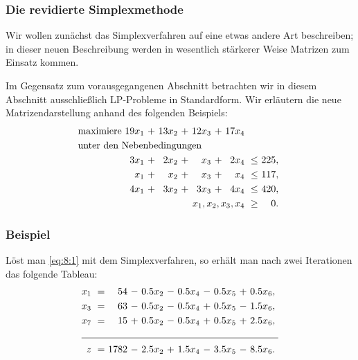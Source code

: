 \documentclass[smaller]{beamer}
\begin{document}
\begin{frame}
 \frametitle{Die revidierte Simplexmethode}
 Wir wollen zunächst das Simplexverfahren auf eine etwas andere Art beschreiben; in dieser neuen Beschreibung werden in wesentlich stärkerer Weise \alert{Matrizen} zum Einsatz kommen. \\ \vspace*{0.2cm}

Im Gegensatz zum vorausgegangenen Abschnitt betrachten wir in diesem Abschnitt ausschließlich LP-Probleme in Standardform. Wir erläutern die neue Matrizendarstellung anhand des folgenden Beispiels:
\begin{align}
\begin{alignedat}{6}
\label{eq:8:1}
& \text{maximiere } & 19x_1 &\ + &\ 13x_2 &\ + &\ 12x_3 &\ + &\ 17x_4 & & \\
& \rlap{unter den Nebenbedingungen} & & & & & & & & & \\
&& 3x_1 &\ + &\ 2x_2 &\ + &\  x_3 &\ + &\ 2x_4 &\ \leq &\ 225,\ \\
&&  x_1 &\ + &\  x_2 &\ + &\  x_3 &\ + &\  x_4 &\ \leq &\ 117,\ \\
&& 4x_1 &\ + &\ 3x_2 &\ + &\ 3x_3 &\ + &\ 4x_4 &\ \leq &\ 420,\ \\
&& & & & & & & \llap{$x_1,x_2,x_3,x_4$} &\ \geq &\ 0.\
\end{alignedat}
\end{align}
\end{frame}

\begin{frame}
 \frametitle{Beispiel}
 Löst man \eqref{eq:8:1} mit dem Simplexverfahren, so erhält man nach zwei Iterationen das folgende Tableau:
\begin{align}
\begin{alignedat}{6}
\label{eq:8:2}
x_1 &\ = &\   54 &\ - &\ 0.5x_2 &\ - &\ 0.5x_4 &\ - &\ 0.5x_5 &\ + &\ 0.5x_6,\ \\
x_3 &\ = &\   63 &\ - &\ 0.5x_2 &\ - &\ 0.5x_4 &\ + &\ 0.5x_5 &\ - &\ 1.5x_6,\ \\
x_7 &\ = &\   15 &\ + &\ 0.5x_2 &\ - &\ 0.5x_4 &\ + &\ 0.5x_5 &\ + &\ 2.5x_6,\ \\ \cline{1-11}
  z &\ = &\ 1782 &\ - &\ 2.5x_2 &\ + &\ 1.5x_4 &\ - &\ 3.5x_5 &\ - &\ 8.5x_6.\
\end{alignedat}
\end{align}
\end{frame}
\end{document}
